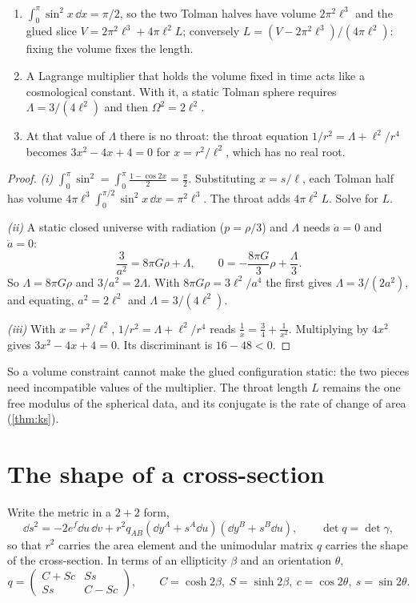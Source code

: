 \begin{proposition}\label{prop:fixvolume}\ver\
\begin{enumerate}[label=(\roman*)]
\item $\int_0^\pi\sin^2x\,\dd x=\pi/2$, so the two Tolman halves have volume $2\pi^2\ell^3$ and the glued slice $V=2\pi^2\ell^3+4\pi\ell^2L$; conversely $L=(V-2\pi^2\ell^3)/(4\pi\ell^2)$: fixing the volume fixes the length.
\item A Lagrange multiplier that holds the volume fixed in time acts like a cosmological constant. With it, a static Tolman sphere requires $\Lambda=3/(4\ell^2)$ and then $\Omega^2=2\ell^2$.
\item At that value of $\Lambda$ there is no throat: the throat equation $1/r^2=\Lambda+\ell^2/r^4$ becomes $3x^2-4x+4=0$ for $x=r^2/\ell^2$, which has no real root.
\end{enumerate}
\end{proposition}
\begin{proof}
\emph{(i)} $\int_0^\pi\sin^2=\int_0^\pi\frac{1-\cos2x}2=\frac\pi2$. Substituting $x=s/\ell$, each Tolman half has volume $4\pi\ell^3\int_0^{\pi/2}\sin^2x\,\dd x=\pi^2\ell^3$. The throat adds $4\pi\ell^2L$. Solve for $L$.

\emph{(ii)} A static closed universe with radiation ($p=\rho/3$) and $\Lambda$ needs $\dot a=0$ and $\ddot a=0$:
\[
\frac3{a^2}=8\pi G\rho+\Lambda,\qquad0=-\frac{8\pi G}3\rho+\frac\Lambda3 .
\]
So $\Lambda=8\pi G\rho$ and $3/a^2=2\Lambda$. With $8\pi G\rho=3\ell^2/a^4$ the first gives $\Lambda=3/(2a^2)$, and equating, $a^2=2\ell^2$ and $\Lambda=3/(4\ell^2)$.

\emph{(iii)} With $x=r^2/\ell^2$, $1/r^2=\Lambda+\ell^2/r^4$ reads $\frac1x=\frac34+\frac1{x^2}$. Multiplying by $4x^2$ gives $3x^2-4x+4=0$. Its discriminant is $16-48<0$.
\end{proof}


So a volume constraint cannot make the glued configuration static: the two pieces need incompatible values of the multiplier. The throat length $L$ remains the one free modulus of the spherical data, and its conjugate is the rate of change of area (\cref{thm:ks}).

\section{The shape of a cross-section}

Write the metric in a $2+2$ form,
\[
\dd s^2=-2e^f\dd u\,\dd v+r^2q_{AB}(\dd y^A+s^A\dd u)(\dd y^B+s^B\dd u),\qquad\det q=\det\gamma,
\]
so that $r^2$ carries the area element and the unimodular matrix $q$ carries the shape of the cross-section. In terms of an ellipticity $\beta$ and an orientation $\theta$,
\[
q=\begin{pmatrix}C+Sc&Ss\\Ss&C-Sc\end{pmatrix},\qquad C=\cosh2\beta,\ S=\sinh2\beta,\ c=\cos2\theta,\ s=\sin2\theta .
\]

